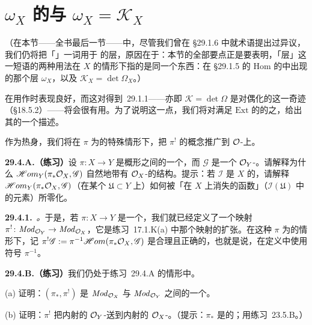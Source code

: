 
\section{$\omega_X$ 的\trAdjunctionFormula{}与 $\omega_X=\mathscr{K}_X$}

（在本节——全书最后一节——中，尽管我们曾在 \S29.1.6 中就术语提出过异议，我们仍将把「\trDualizingSheaf」一词用于 \trSerreDuality{}的\trCanonical{}层，原因在于：本节的全部要点正是要表明，「\trCanonical{}层」这一短语的两种用法在\trSmooth\trProjective\trVariety{} $X$ 的情形下指的是同一个东西：在 \S29.1.5 的 $\mathrm{Hom}$ 的\trSerreDuality{}中出现的那个层 $\omega_X$，以及 $\mathscr{K}_X=\det\Omega_X$。）

\trDualizingSheaf{}在用\trEffectiveCartierDivisor{}作\trSlicing{}时表现良好，而这对得到\mbox{\trDesideratum{}~29.1.1}——亦即 $\mathscr{K}=\det\Omega$ 是\trSerre{}对偶化的这一奇迹（\S18.5.2）——将会很有用。为了说明这一点，我们将对满足 $\mathrm{Ext}$ 的\trSerreDuality{}的\trVariety{}之\trSubvariety，给出其\trDualizingSheaf{}的一个描述。

作为热身，我们将在 $\pi$ 为\trClosedEmbedding{}的特殊情形下，把 $\pi^!$ 的概念推广到 $\mathcal{O}$-\trModule{}上。

\textbf{29.4.A.（练习）}\quad 设 $\pi\colon X\to Y$ 是概形之间的一个\trClosedEmbedding，而 $\mathscr{G}$ 是一个 $\mathcal{O}_Y$-\trModule。请解释为什么 $\mathscr{H}om_Y(\pi_*\mathcal{O}_X,\mathscr{G})$ 自然地带有 $\mathcal{O}_X$-\trModule{}的结构。提示：若 $\mathscr{I}$ 是 $X$ 的\trIdealSheaf，请解释 $\mathscr{H}om_Y(\pi_*\mathcal{O}_X,\mathscr{G})$（在某个\trOpenSubset{} $\mathfrak{U}\subset Y$ 上）如何被「在 $X$ 上消失的函数」（$\mathscr{I}(\mathfrak{U})$ 中的元素）所零化。

\textbf{29.4.1.}\ \emph{\trhDefinition{}。}\quad 于是，若 $\pi\colon X\to Y$ 是一个\trClosedEmbedding，我们就已经定义了一个映射 $\pi^!\colon\mathit{Mod}_{\mathcal{O}_Y}\to\mathit{Mod}_{\mathcal{O}_X}$，它是\mbox{练习~17.1.K(a)} 中那个映射的扩张。在这种 $\pi$ 为\trClosedEmbedding{}的情形下，记 $\pi^!\mathscr{G}:=\pi^{-1}\mathscr{H}om(\pi_*\mathcal{O}_X,\mathscr{G})$ 是合理且正确的，也就是说，在定义中使用符号 $\pi^{-1}$。

\textbf{29.4.B.（练习）}\quad 我们仍处于\mbox{练习~29.4.A} 的情形中。

(a) 证明：$(\pi_*,\pi^!)$ 是 $\mathit{Mod}_{\mathcal{O}_X}$ 与 $\mathit{Mod}_{\mathcal{O}_Y}$ 之间的一个\trAdjointPair。

(b) 证明：$\pi^!$ 把内射的 $\mathcal{O}_Y$-\trModule{}送到内射的 $\mathcal{O}_X$-\trModule。（提示：$\pi_*$ 是\trExact{}的；用\mbox{练习~23.5.B}。）

